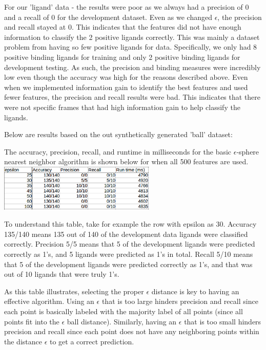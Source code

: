 \documentclass[11pt,letterpaper]{article}
\begin{document}
For our 'ligand' data - the results were poor as we always had a precision of 0 and a recall of 0 for the development dataset.  Even as we changed $\epsilon$, the precision and recall stayed at 0.  This indicates that the features did not have enough information to classify the 2 positive ligands correctly.  This was mainly a dataset problem from having so few positive ligands for data.  Specifically, we only had 8 positive binding ligands for training and only 2 positive binding ligands for development testing.  As such, the precision and binding measures were incredibly low even though the accuracy was high for the reasons described above.  Even when we implemented information gain to identify the best features and used fewer features, the precision and recall results were bad.  This indicates that there were not specific frames that had high information gain to help classify the ligands. 

Below are results based on the out synthetically generated 'ball' dataset:

The accuracy, precision, recall, and runtime in milliseconds for the basic $\epsilon$-sphere nearest neighbor algorithm is shown below for when all 500 features are used. \\

\includegraphics[width=75mm]{epsNNAllFeaturesData.png}

To understand this table, take for example the row with epsilon as 30. 
Accuracy 135/140 means 135 out of 140 of the development data ligands were classified correctly.  Precision 5/5 means that 5 of the development ligands were predicted correctly as 1's, and 5 ligands were predicted as 1's in total.  Recall 5/10 means that 5 of the development ligands were predicted correctly as 1's, and that was out of 10 ligands that were truly 1's.

As this table illustrates, selecting the proper $\epsilon$ distance is key to having an effective algorithm.  Using an $\epsilon$ that is too large hinders precision and recall since each point is basically labeled with the majority label of all points (since all points fit into the $\epsilon$ ball distance).  Similarly, having an $\epsilon$ that is too small hinders precision and recall since each point does not have any neighboring points within the distance $\epsilon$ to get a correct prediction.
\end{document}
